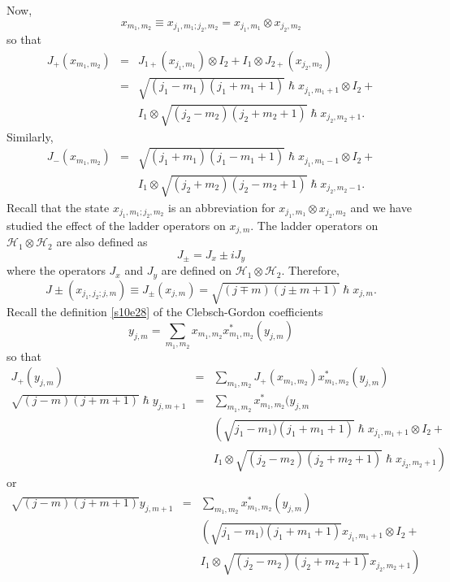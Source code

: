 \documentclass{article}
\numberwithin{equation}{section}
\theoremstyle{plain}
\numberwithin{thm}{section}
\theoremstyle{plain}
\numberwithin{prop}{section}
\theoremstyle{definition}
\numberwithin{defn}{section}
\theoremstyle{remark}
\begin{document}
Now,
\begin{equation}\label{s11e10}
x_{m_1,m_2} \equiv x_{j_1,m_1;j_2,m_2} = x_{j_1,m_1} \otimes x_{j_2,m_2}
\end{equation}
so that
\begin{eqnarray}
J_+(x_{m_1,m_2}) &=&
 J_{1+}(x_{j_1,m_1}) \otimes I_2 + I_1 \otimes J_{2+}(x_{j_2,m_2}) \nonumber \\
 &=& \sqrt{(j_1-m_1)(j_1+m_1+1)}\hslash x_{j_1,m_1+1} \otimes I_2 + \nonumber \\
 & &I_1 \otimes \sqrt{(j_2-m_2)(j_2+m_2+1)}\hslash x_{j_2,m_2+1}.\label{s11e11}
\end{eqnarray}
Similarly,
\begin{eqnarray}
J_-(x_{m_1,m_2})
 &=& \sqrt{(j_1+m_1)(j_1-m_1+1)}\hslash x_{j_1,m_1-1} \otimes I_2 + \nonumber \\
 & &I_1 \otimes \sqrt{(j_2+m_2)(j_2-m_2+1)}\hslash x_{j_2,m_2-1}.\label{s11e12}
\end{eqnarray}
Recall that the state $x_{j_1,m_1;j_2,m_2}$ is an abbreviation for $x_{j_1,m_1}
\otimes x_{j_2,m_2}$ and we have studied the effect of the ladder operators on
$x_{j,m}$. The ladder operators on $\mathcal{H}_1 \otimes \mathcal{H}_2$ are
also defined as
\begin{equation}\label{s11e13}
J_{\pm} = J_x \pm iJ_y
\end{equation}
where the operators $J_x$ and $J_y$ are defined on $\mathcal{H}_1 \otimes 
\mathcal{H}_2$. Therefore,
\begin{equation}\label{s11e14}
J\pm(x_{j_1,j_2;j,m}) \equiv J_\pm(x_{j,m}) = 
\sqrt{(j \mp m)(j \pm m + 1)}\hslash x_{j,m}.
\end{equation}
Recall the definition \eqref{s10e28} of the Clebsch-Gordon coefficients
\[
y_{j,m} = \sum_{m_1, m_2}x_{m_1,m_2}x_{m_1,m_2}^\ast (y_{j,m})
\]
so that
\begin{eqnarray*}
J_+(y_{j,m}) &=& \sum_{m_1,m_2}J_+(x_{m_1,m_2})x_{m_1,m_2}^\ast (y_{j,m})
\\
\sqrt{(j-m)(j+m+1)}\hslash y_{j,m+1} &=& \sum_{m_1,m_2}x_{m_1,m_2}^\ast (y_{j,m}
\\
 & &\left(\sqrt{j_1-m_1)(j_1+m_1+1)}\hslash x_{j_1,m_1+1} \otimes I_2 + \right. 
\\
 & & \left. I_1 \otimes \sqrt{(j_2-m_2)(j_2+m_2+1)}\hslash x_{j_2,m_2+1}\right)
\end{eqnarray*}
or
\begin{eqnarray}
\sqrt{(j-m)(j+m+1)}y_{j,m+1} &=& \sum_{m_1,m_2}x_{m_1,m_2}^\ast (y_{j,m}) 
\nonumber \\
 & & \left(\sqrt{j_1-m_1)(j_1+m_1+1)}x_{j_1,m_1+1} \otimes I_2 + \right. 
\nonumber \\
 & & \left. I_1 \otimes \sqrt{(j_2-m_2)(j_2+m_2+1)}x_{j_2,m_2+1}\right)
\nonumber \\
 & & \label{s11e15}
\end{eqnarray}
\end{document}

